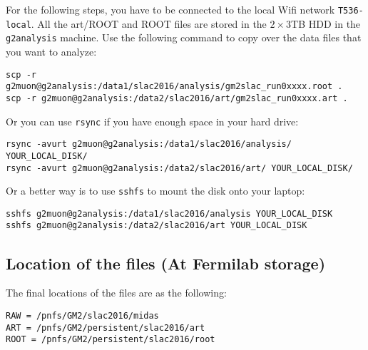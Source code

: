 For the following steps, you have to be connected to the local Wifi network \verb+T536-local+.
All the art/ROOT and ROOT files are stored in the $2\times3$TB HDD in the \verb+g2analysis+ machine.
Use the following command to copy over the data files that you want to analyze: 
%
\begin{lstlisting}[frame=single, basicstyle=\ttfamily\footnotesize]
scp -r g2muon@g2analysis:/data1/slac2016/analysis/gm2slac_run0xxxx.root . 
scp -r g2muon@g2analysis:/data2/slac2016/art/gm2slac_run0xxxx.art .
\end{lstlisting}
%
Or you can use \verb+rsync+ if you have enough space in your hard drive:
%
\begin{lstlisting}[frame=single, basicstyle=\ttfamily\footnotesize]
rsync -avurt g2muon@g2analysis:/data1/slac2016/analysis/ YOUR_LOCAL_DISK/
rsync -avurt g2muon@g2analysis:/data2/slac2016/art/ YOUR_LOCAL_DISK/
\end{lstlisting}
%
Or a better way is to use \verb+sshfs+ to mount the disk onto your laptop:
\begin{lstlisting}[frame=single, basicstyle=\ttfamily\footnotesize]
sshfs g2muon@g2analysis:/data1/slac2016/analysis YOUR_LOCAL_DISK
sshfs g2muon@g2analysis:/data2/slac2016/art YOUR_LOCAL_DISK
\end{lstlisting}

\subsection{Location of the files (At Fermilab storage)}

The final locations of the files are as the following:

\begin{lstlisting}[frame=single, basicstyle=\ttfamily\footnotesize]
RAW = /pnfs/GM2/slac2016/midas
ART = /pnfs/GM2/persistent/slac2016/art
ROOT = /pnfs/GM2/persistent/slac2016/root
\end{lstlisting}